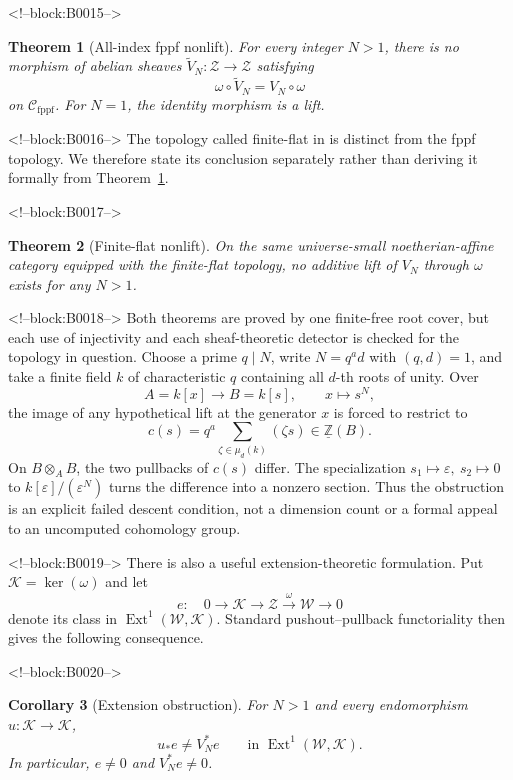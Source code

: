 \documentclass[11pt]{article}
\newtheorem{theorem}{Theorem}[section]
\newtheorem{corollary}[theorem]{Corollary}
\theoremstyle{definition}
\newcommand{\Ext}{\operatorname{Ext}}
\newcommand{\Zpre}{\underline{\mathbb Z}}
\newcommand{\Zsh}{\mathcal Z}
\newcommand{\Wsh}{\mathcal W}
\newcommand{\Ksh}{\mathcal K}
\newcommand{\fppf}{\mathrm{fppf}}
\begin{document}
<!--block:B0015-->
\begin{theorem}[All-index fppf nonlift]\label{thm:fppf}
For every integer \(N>1\), there is no morphism of abelian sheaves
\(\widetilde V_N\colon\Zsh\to\Zsh\) satisfying
\[
 \omega\circ\widetilde V_N=V_N\circ\omega
\]
on \(\mathscr C_{\fppf}\).  For \(N=1\), the identity morphism is a lift.
\end{theorem}

<!--block:B0016-->
The topology called finite-flat in
\cite[Sec.~4]{Deninger2025Rational} is distinct from the fppf topology.
We therefore state its conclusion separately rather than deriving it
formally from Theorem~\ref{thm:fppf}.

<!--block:B0017-->
\begin{theorem}[Finite-flat nonlift]\label{thm:ff}
On the same universe-small noetherian-affine category equipped with the
finite-flat topology, no additive lift of \(V_N\) through \(\omega\) exists
for any \(N>1\).
\end{theorem}

<!--block:B0018-->
Both theorems are proved by one finite-free root cover, but each use of
injectivity and each sheaf-theoretic detector is checked for the topology
in question.  Choose a prime \(q\mid N\), write \(N=q^a d\) with
\((q,d)=1\), and take a finite field \(k\) of characteristic \(q\)
containing all \(d\)-th roots of unity.  Over
\[
 A=k[x]\longrightarrow B=k[s],\qquad x\longmapsto s^N,
\]
the image of any hypothetical lift at the generator \(x\) is forced to
restrict to
\[
 c(s)=q^a\sum_{\zeta\in\mu_d(k)}(\zeta s)\in\Zpre(B).
\]
On \(B\otimes_A B\), the two pullbacks of \(c(s)\) differ.  The
specialization \(s_1\mapsto\varepsilon,\ s_2\mapsto0\) to
\(k[\varepsilon]/(\varepsilon^N)\) turns the difference into a nonzero
section.  Thus the obstruction is an explicit failed descent condition,
not a dimension count or a formal appeal to an uncomputed cohomology
group.

<!--block:B0019-->
There is also a useful extension-theoretic formulation.  Put
\(\Ksh=\ker(\omega)\) and let
\[
 e:\quad 0\longrightarrow\Ksh\longrightarrow\Zsh
 \xrightarrow{\omega}\Wsh\longrightarrow0
 \tag{1.1}\label{eq:extension}
\]
denote its class in \(\Ext^1(\Wsh,\Ksh)\).  Standard pushout--pullback
functoriality then gives the following consequence.

<!--block:B0020-->
\begin{corollary}[Extension obstruction]\label{cor:ext}
For \(N>1\) and every endomorphism \(u\colon\Ksh\to\Ksh\),
\[
 u_*e\ne V_N^*e\qquad\text{in }\Ext^1(\Wsh,\Ksh).
\]
In particular, \(e\ne0\) and \(V_N^*e\ne0\).
\end{corollary}
\end{document}

